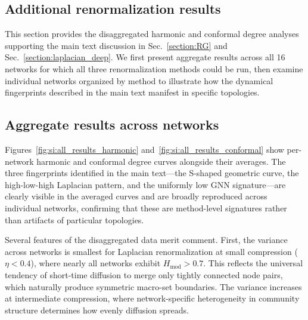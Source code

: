 \documentclass[twocolumn,superscriptaddress,tightenlines,aps,prx,floatfix]{revtex4-2}
\begin{document}
\begin{bibunit}


\section{Additional renormalization results}
\label{sec:detailed_renorm_sm}
 
This section provides the disaggregated harmonic and conformal degree analyses supporting the main text discussion in Sec.~\ref*{section:RG} and Sec.~\ref*{section:laplacian_deep}. We first present aggregate results across all 16 networks for which all three renormalization methods could be run, then examine individual networks organized by method to illustrate how the dynamical fingerprints described in the main text manifest in specific topologies.
 
\subsection{Aggregate results across networks}
Figures~\ref{fig:si:all_results_harmonic} and~\ref{fig:si:all_results_conformal} show per-network harmonic and conformal degree curves alongside their averages. The three fingerprints identified in the main text---the S-shaped geometric curve, the high-low-high Laplacian pattern, and the uniformly low GNN signature---are clearly visible in the averaged curves and are broadly reproduced across individual networks, confirming that these are method-level signatures rather than artifacts of particular topologies.

Several features of the disaggregated data merit comment. First, the variance across networks is smallest for Laplacian renormalization at small compression ($\eta < 0.4$), where nearly all networks exhibit $H_{\text{mod}} > 0.7$. This reflects the universal tendency of short-time diffusion to merge only tightly connected node pairs, which naturally produce symmetric macro-set boundaries. The variance increases at intermediate compression, where network-specific heterogeneity in community structure determines how evenly diffusion spreads.


\end{bibunit}
\end{document}
